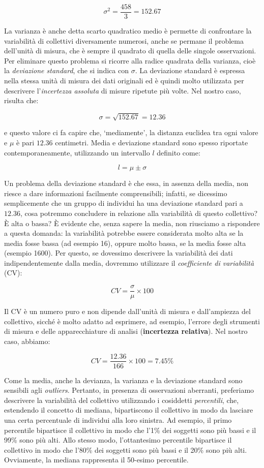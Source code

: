 \documentclass[
  12pt,
]{book}
\begin{document}
\[\sigma^2  = \frac{458}{3} = 152.67\]

La varianza è anche detta scarto quadratico medio è permette di confrontare la variabilità di collettivi diversamente numerosi, anche se permane il problema dell'unità di misura, che è sempre il quadrato di quella delle singole osservazioni. Per eliminare questo problema si ricorre alla radice quadrata della varianza, cioè la \emph{deviazione standard}, che si indica con \(\sigma\). La deviazione standard è espressa nella stessa unità di misura dei dati originali ed è quindi molto utilizzata per descrivere l'\emph{incertezza assoluta} di misure ripetute più volte. Nel nostro caso, risulta che:

\[\sigma  = \sqrt{152.67} = 12.36\]

e questo valore ci fa capire che, `mediamente', la distanza euclidea tra ogni valore e \(\mu\) è pari \(12.36\) centimetri. Media e deviazione standard sono spesso riportate contemporaneamente, utilizzando un intervallo \(l\) definito come:

\[l = \mu \pm \sigma\]

Un problema della deviazione standard è che essa, in assenza della media, non riesce a dare informazioni facilmente comprensibili; infatti, se dicessimo semplicemente che un gruppo di individui ha una deviazione standard pari a \(12.36\), cosa potremmo concludere in relazione alla variabilità di questo collettivo? È alta o bassa? È evidente che, senza sapere la media, non riusciamo a rispondere a questa domanda: la variabilità potrebbe essere considerata molto alta se la media fosse bassa (ad esempio 16), oppure molto bassa, se la media fosse alta (esempio 1600). Per questo, se dovessimo descrivere la variabilità dei dati indipendentemente dalla media, dovremmo utilizzare il \emph{coefficiente di variabilità} (CV):

\[CV = \frac{\sigma }{\mu } \times 100\]

Il CV è un numero puro e non dipende dall'unità di misura e dall'ampiezza del collettivo, sicché è molto adatto ad esprimere, ad esempio, l'errore degli strumenti di misura e delle apparecchiature di analisi (\textbf{incertezza relativa}). Nel nostro caso, abbiamo:

\[CV = \frac{12.36}{166} \times 100 = 7.45 \%\]

Come la media, anche la devianza, la varianza e la deviazione standard sono sensibili agli \emph{outliers}. Pertanto, in presenza di osservazioni aberranti, preferiamo descrivere la variabilità del collettivo utilizzando i cosiddetti \emph{percentili}, che, estendendo il concetto di mediana, bipartiscono il collettivo in modo da lasciare una certa percentuale di individui alla loro sinistra. Ad esempio, il primo percentile bipartisce il collettivo in modo che l'1\% dei soggetti sono più bassi e il 99\% sono più alti. Allo stesso modo, l'ottantesimo percentile bipartisce il collettivo in modo che l'80\% dei soggetti sono più bassi e il 20\% sono più alti. Ovviamente, la mediana rappresenta il 50-esimo percentile.
\end{document}
